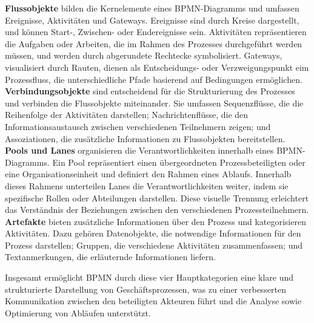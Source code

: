 \textbf{Flussobjekte} bilden die Kernelemente eines \ac{BPMN}-Diagramms und umfassen Ereignisse, Aktivitäten und Gateways. Ereignisse sind durch Kreise dargestellt, und können Start-, Zwischen- oder Endereignisse sein. 
Aktivitäten repräsentieren die Aufgaben oder Arbeiten, die im Rahmen des Prozesses durchgeführt werden müssen, und werden durch abgerundete Rechtecke symbolisiert.
Gateways, visualisiert durch Rauten, dienen als Entscheidungs- oder Verzweigungspunkt eim Prozessfluss, die unterschiedliche Pfade basierend auf Bedingungen ermöglichen. \\
\textbf{Verbindungsobjekte} sind entscheidend für die Strukturierung des Prozesses und verbinden die Flussobjekte miteinander. Sie umfassen Sequenzflüsse, die die Reihenfolge der Aktivitäten darstellen; Nachrichtenflüsse, die den Informationsaustausch zwischen verschiedenen Teilnehmern zeigen; und Assoziationen, die zusätzliche Informationen zu Flussobjekten bereitstellen.\\
\textbf{Pools und Lanes} organisieren die Verantwortlichkeiten innerhalb eines \ac{BPMN}-Diagramms. Ein Pool repräsentiert einen übergeordneten Prozessbeteiligten oder eine Organisationseinheit und definiert den Rahmen eines Ablaufs. Innerhalb dieses Rahmens unterteilen Lanes die Verantwortlichkeiten weiter, indem sie spezifische Rollen oder Abteilungen darstellen. Diese visuelle Trennung erleichtert das Verständnis der Beziehungen zwischen den verschiedenen Prozessteilnehmern.\\
\textbf{Artefakte} bieten zusätzliche Informationen über den Prozess und kategorisieren Aktivitäten. Dazu gehören Datenobjekte, die notwendige Informationen für den Prozess darstellen; Gruppen, die verschiedene Aktivitäten zusammenfassen; und Textanmerkungen, die erläuternde Informationen liefern.

Insgesamt ermöglicht \ac{BPMN} durch diese vier Hauptkategorien eine klare und strukturierte Darstellung von Geschäftsprozessen, was zu einer verbesserten Kommunikation zwischen den beteiligten Akteuren führt und die Analyse sowie Optimierung von Abläufen unterstützt. \cite[Vgl.][]{OMG} \cite[Vgl.][]{Lindenbach} \cite[Vgl.][S. 27-111]{Freund}

\newpage
{}

